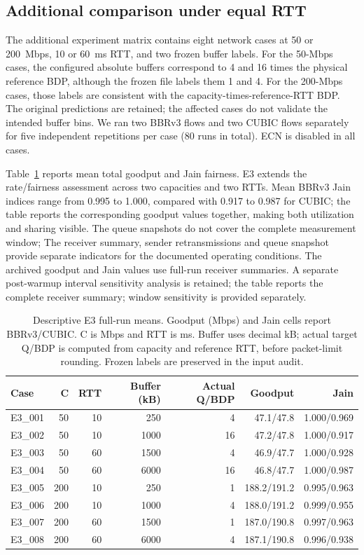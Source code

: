 \subsection{Additional comparison under equal RTT}
The additional experiment matrix contains eight network cases at 50 or
200~Mbps, 10 or 60~ms RTT, and two frozen buffer labels.
For the 50-Mbps cases, the configured absolute buffers correspond
to 4 and 16 times the physical reference BDP, although the frozen file
labels them 1 and 4. For the 200-Mbps cases, those labels are consistent
with the capacity-times-reference-RTT BDP. The original predictions
are retained; the affected cases do not validate the intended buffer bins. We ran two BBRv3 flows
and two CUBIC flows separately for five independent repetitions per case
(80 runs in total). ECN is disabled in all cases.

Table~\ref{tab:e3_candidate} reports mean total goodput and Jain fairness.
E3 extends the rate/fairness assessment across two capacities and two
RTTs. Mean BBRv3 Jain indices range from 0.995 to 1.000, compared with
0.917 to 0.987 for CUBIC; the table reports the corresponding goodput
values together, making both utilization and sharing visible. The queue snapshots do not cover the complete measurement window;
The receiver summary, sender retransmissions and queue snapshot provide
separate indicators for the documented operating conditions.
The archived goodput and Jain values use full-run receiver summaries.
A separate post-warmup interval sensitivity analysis is retained;
the table reports the complete receiver summary; window sensitivity is
provided separately.

\begin{table}[htbp]
\centering
\caption{Descriptive E3 full-run means. Goodput (Mbps) and Jain cells report BBRv3/CUBIC. C is Mbps and RTT is ms. Buffer uses decimal kB; actual target Q/BDP is computed from capacity and reference RTT, before packet-limit rounding. Frozen labels are preserved in the input audit.}
\label{tab:e3_candidate}
\begin{tabular}{lrrrrrr}
\toprule
Case & C & RTT & Buffer (kB) & Actual Q/BDP & Goodput & Jain \\
\midrule
E3\_001 & 50 & 10 & 250 & 4 & 47.1/47.8 & 1.000/0.969 \\
E3\_002 & 50 & 10 & 1000 & 16 & 47.2/47.8 & 1.000/0.917 \\
E3\_003 & 50 & 60 & 1500 & 4 & 46.9/47.7 & 1.000/0.928 \\
E3\_004 & 50 & 60 & 6000 & 16 & 46.8/47.7 & 1.000/0.987 \\
E3\_005 & 200 & 10 & 250 & 1 & 188.2/191.2 & 0.995/0.963 \\
E3\_006 & 200 & 10 & 1000 & 4 & 188.0/191.2 & 0.999/0.955 \\
E3\_007 & 200 & 60 & 1500 & 1 & 187.0/190.8 & 0.997/0.963 \\
E3\_008 & 200 & 60 & 6000 & 4 & 187.1/190.8 & 0.996/0.938 \\
\bottomrule
\end{tabular}
\end{table}

